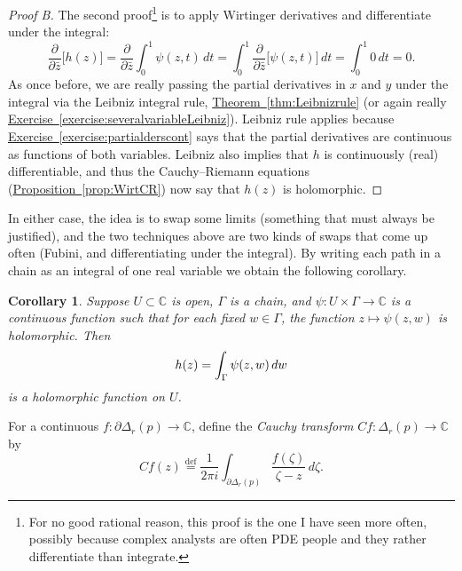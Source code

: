 \documentclass[12pt,openany]{book}
\newcommand{\avoidbreak}{\postdisplaypenalty=100}
\newcommand{\C}{{\mathbb{C}}}
\newcommand{\myindex}[1]{#1\index{#1}}
\theoremstyle{plain}
\newtheorem{cor}[thm]{Corollary}
\theoremstyle{remark}
\theoremstyle{definition}
\theoremstyle{exercise}
\theoremstyle{example}
\newcommand{\exerciseref}[1]{\hyperref[#1]{Exercise~\ref*{#1}}}
\newcommand{\thmref}[1]{\hyperref[#1]{Theorem~\ref*{#1}}}
\newcommand{\propref}[1]{\hyperref[#1]{Proposition~\ref*{#1}}}
\begin{document}
\begin{proof}[Proof B]
The second proof\footnote{%
For no good rational reason, this proof is the one I have seen more often,
possibly because complex analysts are often PDE
people and they rather differentiate than integrate.}
is to apply Wirtinger derivatives and differentiate under the integral:
\begin{equation*}
\frac{\partial}{\partial \bar{z}}
\bigl[
h(z)
\bigr]
=
\frac{\partial}{\partial \bar{z}}
\int_0^1 \psi(z,t) \, dt
=
\int_0^1
\frac{\partial}{\partial \bar{z}}
\bigl[
\psi(z,t)
\bigr]
\, dt
= \int_0^1 0 \, dt = 0.
\end{equation*}
As once before, we are really passing the partial derivatives in $x$
and $y$ under the integral via the Leibniz integral rule,
\thmref{thm:Leibnizrule} (or again really
\exerciseref{exercise:severalvariableLeibniz}).
Leibniz rule applies because 
\exerciseref{exercise:partialderscont} says that the partial
derivatives are continuous as functions of both variables.
Leibniz also implies that $h$ is continuously (real) differentiable,
and thus
the Cauchy--Riemann equations
(\propref{prop:WirtCR}) now
say that $h(z)$ is holomorphic.
\end{proof}

In either case, the idea is to swap some limits (something that must always
be justified),
and the two techniques above are two kinds of swaps that come up
often (Fubini, and differentiating under the integral).  By writing each
path in a chain as an integral of one real variable we obtain the following
corollary.

\begin{cor} \label{cor:holfuncbyintegral}
Suppose $U \subset \C$ is open, $\Gamma$ is a 
chain,
and
$\psi \colon U \times \Gamma \to \C$ is a continuous function such that
for each fixed $w \in \Gamma$, the function $z \mapsto \psi(z,w)$ is
holomorphic.  Then
\begin{equation*}
h(z) =
\int_\Gamma \psi(z,w) \, dw
\avoidbreak
\end{equation*}
is a holomorphic function on $U$.
\end{cor}

For a continuous $f \colon \partial \Delta_r(p) \to \C$, define
the \emph{\myindex{Cauchy transform}} $Cf \colon \Delta_r(p) \to \C$ by
%
\begin{equation*}
Cf(z)
\overset{\text{def}}{=}
\frac{1}{2\pi i}
\int_{\partial \Delta_r(p)}
\frac{f(\zeta)}{\zeta-z}\, d\zeta .
\end{equation*}
\end{document}
